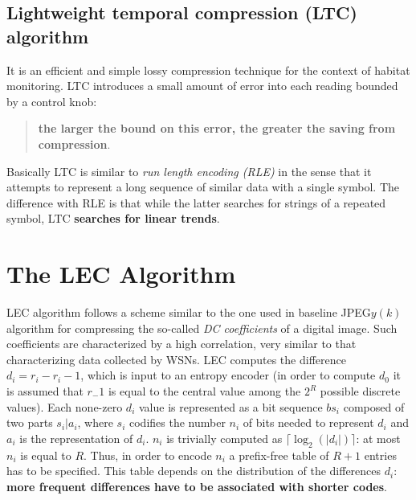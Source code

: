 \subsection{Lightweight temporal compression (LTC) algorithm}

It is an efficient and simple \textcolor[rgb]{1,0,0}{lossy compression} technique for the \textcolor[rgb]{1,0,0}{context of habitat monitoring}. LTC introduces a small amount of error into each reading bounded by a control knob: 
\begin{quote}
    \textbf{\textcolor[rgb]{1,0,0}{the larger the bound on this error, the greater the saving from compression}}. 
\end{quote}
Basically LTC is similar to \emph{\textcolor[rgb]{1,0,0}{run length encoding (RLE)}} in the sense that \textcolor[rgb]{1,0,0}{it attempts to represent a long sequence of similar data with a single symbol}. The difference with RLE is that while the latter searches for strings of a repeated symbol, LTC \textbf{\textcolor[rgb]{1,0,0}{searches for linear trends}}. 


\section{The LEC Algorithm}

LEC algorithm follows a scheme similar to the one used in baseline JPEG$y(k)$ algorithm for compressing the so-called \emph{DC coefficients} of a digital image. Such coefficients are characterized by a high correlation, very similar to that characterizing data collected by WSNs. LEC computes the difference $d_i = r_i - r_i-1$, which is input to an entropy encoder (in order to compute $d_0$ it is assumed that $r_-1$ is equal to the central value among the $2^R$ possible discrete values). Each none-zero $d_i$ value is represented as a bit sequence $bs_i$ composed of two parts $s_i | a_i$, where $s_i$ codifies the number $n_i$ of bits needed to represent $d_i$ and $a_i$ is the representation of $d_i$. $n_i$ is trivially computed as $\lceil\log_2(|d_i|)\rceil$: at most $n_i$ is equal to $R$. Thus, in order to encode $n_i$ a prefix-free table of $R+1$ entries has to be specified. This table depends on the distribution of the differences $d_i$: \textbf{\textcolor[rgb]{1,0,0}{more frequent differences have to be associated with shorter codes}}. 
